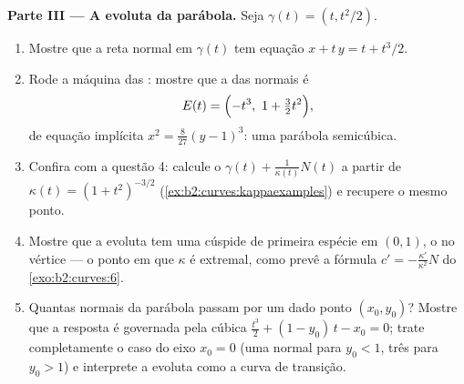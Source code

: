 \begin{problem}
\medskip
\noindent\textbf{Parte III --- A evoluta da parábola.}
Seja $\gamma(t) = (t, t^2/2)$.
\begin{enumerate}[resume]
  \item Mostre que a reta normal em $\gamma(t)$ tem equação
        $x + t\,y = t + t^3/2$.
  \item Rode a máquina das : mostre que a  das
        normais é
        \[
        E(t) = \Bigl(-t^3,\ 1 + \tfrac32 t^2\Bigr),
        \]
        de equação implícita $x^2 = \tfrac8{27}(y - 1)^3$:
        uma parábola semicúbica.
  \item Confira com a questão 4: calcule o  $\gamma(t) + \frac1{\kappa(t)}N(t)$ a partir de
        $\kappa(t) = (1 + t^2)^{-3/2}$
        (\cref{ex:b2:curves:kappaexamples}) e recupere o
        mesmo ponto.
  \item Mostre que a evoluta tem uma cúspide de primeira espécie em
        $(0, 1)$, o  no vértice ---
        o ponto em que $\kappa$ é extremal, como prevê
        a fórmula $c' = -\frac{\kappa'}{\kappa^2}N$ do
        \cref{exo:b2:curves:6}.
  \item Quantas normais da parábola passam por um dado
        ponto $(x_0, y_0)$? Mostre que a resposta é governada pela
        cúbica $\tfrac{t^3}2 + (1 - y_0)\,t - x_0 = 0$;
        trate completamente o caso do eixo $x_0 = 0$ (uma normal
        para $y_0 < 1$, três para $y_0 > 1$) e interprete
        a evoluta como a curva de transição.
\end{enumerate}


\end{problem}
